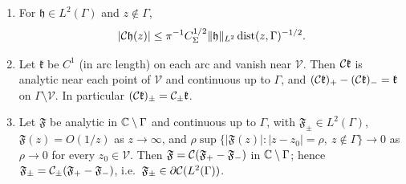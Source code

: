 \begin{lemma}\label{lem:cauchy-arcs}
\begin{enumerate}
\item[(a)] For $\mathfrak h\in L^2(\Gamma)$ and $z\notin\Gamma$,
  \[
    |\mathcal{C}\mathfrak h(z)|\le\pi^{-1}C_\Sigma^{1/2}\|\mathfrak h\|_{L^2}\,\mathrm{dist}(z,\Gamma)^{-1/2}.
  \]
\item[(b)] Let $\mathfrak k$ be $C^1$ (in arc length) on each arc and vanish near $\mathcal V$. Then $\mathcal{C}\mathfrak k$ is
  analytic near each point of $\mathcal V$ and continuous up to $\Gamma$, and $(\mathcal{C}\mathfrak k)_+-(\mathcal{C}\mathfrak
  k)_-=\mathfrak k$ on $\Gamma\setminus\mathcal V$. In particular $(\mathcal{C}\mathfrak k)_\pm=\mathcal{C}_\pm\mathfrak k$.
\item[(c)] Let $\mathfrak F$ be analytic in $\mathbb{C}\setminus\Gamma$ and continuous up to $\Gamma$, with $\mathfrak F_\pm\in L^2(\Gamma)$,
  $\mathfrak F(z)=O(1/z)$ as $z\to\infty$, and $\rho\sup\{|\mathfrak F(z)|:|z-z_0|=\rho,\ z\notin\Gamma\}\to0$ as $\rho\to0$ for every
  $z_0\in\mathcal V$. Then $\mathfrak F=\mathcal{C}(\mathfrak F_+-\mathfrak F_-)$ in $\mathbb{C}\setminus\Gamma$; hence $\mathfrak F_\pm=\mathcal{C}_\pm(\mathfrak F_+-\mathfrak F_-)$, i.e.\
  $\mathfrak F_\pm\in\partial\mathcal{C}(L^2(\Gamma))$.
\end{enumerate}
\end{lemma}

